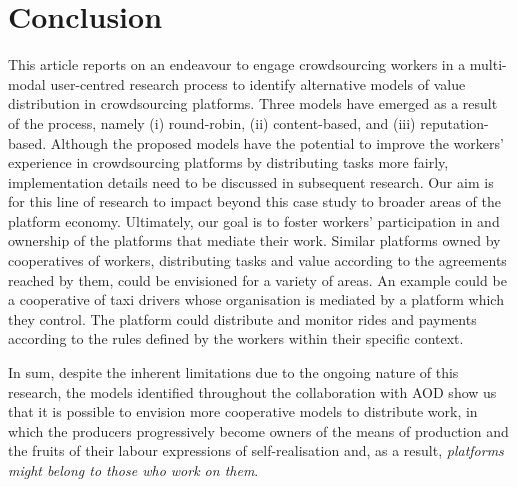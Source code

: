 
\section{Conclusion}\label{sec:conclusion}
This article reports on an endeavour to engage crowdsourcing workers in a multi-modal user-centred research process to identify alternative models of value distribution in crowdsourcing platforms. Three models have emerged as a result of the process, namely (i) round-robin, (ii) content-based, and (iii) reputation-based. Although the proposed models have the potential to improve the workers' experience in crowdsourcing platforms by distributing tasks more fairly, implementation details need to be discussed in subsequent research. Our aim is for this line of research to impact beyond this case study to broader areas of the platform economy. Ultimately, our goal is to foster workers' participation in and ownership of the platforms that mediate their work. Similar platforms owned by cooperatives of workers, distributing tasks and value according to the agreements reached by them, could be envisioned for a variety of areas. An example could be a cooperative of taxi drivers whose organisation is mediated by a platform which they control. The platform could distribute and monitor rides and payments according to the rules defined by the workers within their specific context.

 In sum, despite the inherent limitations due to the ongoing nature of this research, the models identified throughout the collaboration with AOD show us that it is possible to envision more cooperative models to distribute work, in which the producers progressively become owners of the means of production and the fruits of their labour expressions of self-realisation \cite{hansson_capitalizing_2018} and, as a result, \textit{platforms might belong to those who work on them}.